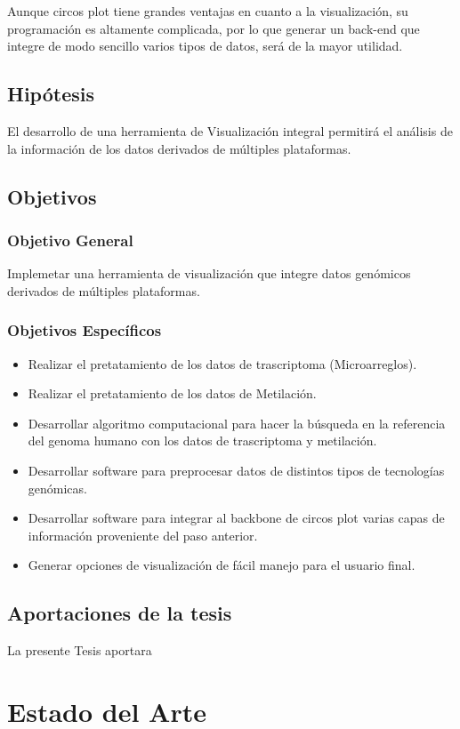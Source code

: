 \documentclass[12pt,letterpaper]{article}
\begin{document}
Aunque circos plot tiene grandes ventajas en cuanto a la visualización, su programación es altamente complicada, por lo que generar un back-end que integre de modo sencillo varios tipos de datos, será de la mayor utilidad. 

\subsection{Hipótesis}
El desarrollo de una herramienta de Visualización integral permitirá el análisis de la información de los datos derivados de múltiples plataformas.
\subsection{Objetivos}
\subsubsection{Objetivo General}
Implemetar una herramienta de visualización que integre datos genómicos derivados de múltiples plataformas.
\subsubsection{Objetivos Específicos}
\begin{itemize}
\item Realizar el pretatamiento de los datos de trascriptoma (Microarreglos).
\item Realizar el pretatamiento de los datos de Metilación.
\item Desarrollar algoritmo computacional para hacer la búsqueda en la referencia del genoma humano con los datos de trascriptoma y metilación.
\item Desarrollar software para preprocesar datos de distintos tipos de tecnologías genómicas.
\item Desarrollar software para integrar al backbone de circos plot varias capas de información proveniente del paso anterior.
\item Generar opciones de visualización de fácil manejo para el usuario final.

\end{itemize}
\subsection{Aportaciones de la tesis}
La presente Tesis aportara
\section{Estado del Arte}
\end{document}
